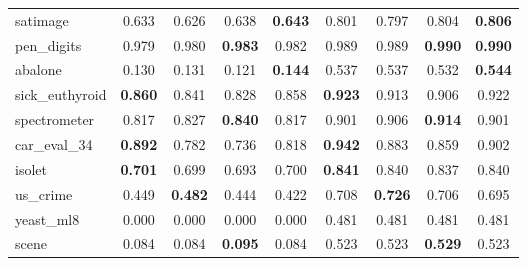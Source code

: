 \begin{figure}[ht]
\begin{tabular}{p{22mm}|*4{p{14mm}}|*4{p{14mm}}}
        satimage&\multicolumn{1}{c}{0.633}&\multicolumn{1}{c}{0.626}&\multicolumn{1}{c}{0.638}&\multicolumn{1}{c|}{\textbf{0.643}}&\multicolumn{1}{c}{0.801}&\multicolumn{1}{c}{0.797}&\multicolumn{1}{c}{0.804}&\multicolumn{1}{c}{\textbf{0.806}}\\
        pen\_digits&\multicolumn{1}{c}{0.979}&\multicolumn{1}{c}{0.980}&\multicolumn{1}{c}{\textbf{0.983}}&\multicolumn{1}{c|}{0.982}&\multicolumn{1}{c}{0.989}&\multicolumn{1}{c}{0.989}&\multicolumn{1}{c}{\textbf{0.990}}&\multicolumn{1}{c}{\textbf{0.990}}\\
        abalone&\multicolumn{1}{c}{0.130}&\multicolumn{1}{c}{0.131}&\multicolumn{1}{c}{0.121}&\multicolumn{1}{c|}{\textbf{0.144}}&\multicolumn{1}{c}{0.537}&\multicolumn{1}{c}{0.537}&\multicolumn{1}{c}{0.532}&\multicolumn{1}{c}{\textbf{0.544}}\\
        sick\_euthyroid&\multicolumn{1}{c}{\textbf{0.860}}&\multicolumn{1}{c}{0.841}&\multicolumn{1}{c}{0.828}&\multicolumn{1}{c|}{0.858}&\multicolumn{1}{c}{\textbf{0.923}}&\multicolumn{1}{c}{0.913}&\multicolumn{1}{c}{0.906}&\multicolumn{1}{c}{0.922}\\
        spectrometer&\multicolumn{1}{c}{0.817}&\multicolumn{1}{c}{0.827}&\multicolumn{1}{c}{\textbf{0.840}}&\multicolumn{1}{c|}{0.817}&\multicolumn{1}{c}{0.901}&\multicolumn{1}{c}{0.906}&\multicolumn{1}{c}{\textbf{0.914}}&\multicolumn{1}{c}{0.901}\\
        car\_eval\_34&\multicolumn{1}{c}{\textbf{0.892}}&\multicolumn{1}{c}{0.782}&\multicolumn{1}{c}{0.736}&\multicolumn{1}{c|}{0.818}&\multicolumn{1}{c}{\textbf{0.942}}&\multicolumn{1}{c}{0.883}&\multicolumn{1}{c}{0.859}&\multicolumn{1}{c}{0.902}\\
        isolet&\multicolumn{1}{c}{\textbf{0.701}}&\multicolumn{1}{c}{0.699}&\multicolumn{1}{c}{0.693}&\multicolumn{1}{c|}{0.700}&\multicolumn{1}{c}{\textbf{0.841}}&\multicolumn{1}{c}{0.840}&\multicolumn{1}{c}{0.837}&\multicolumn{1}{c}{0.840}\\
        us\_crime&\multicolumn{1}{c}{0.449}&\multicolumn{1}{c}{\textbf{0.482}}&\multicolumn{1}{c}{0.444}&\multicolumn{1}{c|}{0.422}&\multicolumn{1}{c}{0.708}&\multicolumn{1}{c}{\textbf{0.726}}&\multicolumn{1}{c}{0.706}&\multicolumn{1}{c}{0.695}\\
        yeast\_ml8&\multicolumn{1}{c}{0.000}&\multicolumn{1}{c}{0.000}&\multicolumn{1}{c}{0.000}&\multicolumn{1}{c|}{0.000}&\multicolumn{1}{c}{0.481}&\multicolumn{1}{c}{0.481}&\multicolumn{1}{c}{0.481}&\multicolumn{1}{c}{0.481}\\
        scene&\multicolumn{1}{c}{0.084}&\multicolumn{1}{c}{0.084}&\multicolumn{1}{c}{\textbf{0.095}}&\multicolumn{1}{c|}{0.084}&\multicolumn{1}{c}{0.523}&\multicolumn{1}{c}{0.523}&\multicolumn{1}{c}{\textbf{0.529}}&\multicolumn{1}{c}{0.523}\\

\end{tabular}
\end{figure}
